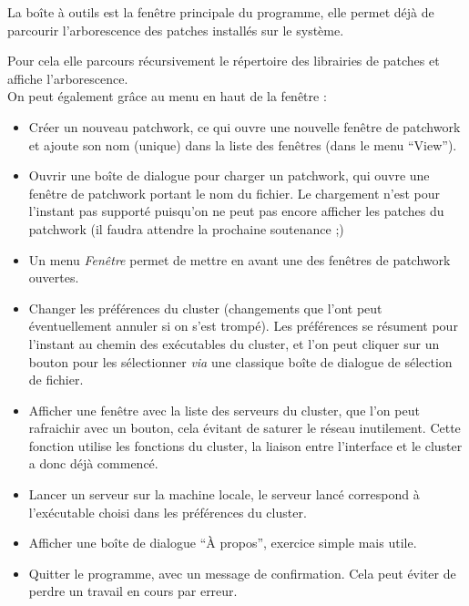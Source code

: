 \documentclass[14pt,a4paper]{report}
\begin{document}
La bo\^ite \`a outils est la fen\^etre principale du programme,
elle permet d\'ej\`a de parcourir l'arborescence des patches
install\'es sur le syst\`eme.

Pour cela elle parcours r\'ecursivement le r\'epertoire des librairies
de patches et affiche l'arborescence.\\


On peut \'egalement gr\^ace au menu en haut de la fen\^etre :
\begin{itemize}
\item
  Cr\'eer un nouveau patchwork, ce qui ouvre une nouvelle fen\^etre
  de patchwork et ajoute son nom (unique) dans la liste des fen\^etres
  (dans le menu ``View'').

\item
  Ouvrir une bo\^ite de dialogue pour charger un patchwork, qui
  ouvre une fen\^etre de patchwork portant le nom du fichier.
  Le chargement n'est pour l'instant pas support\'e puisqu'on ne peut
  pas encore afficher les patches du patchwork (il faudra attendre
  la prochaine soutenance ;)

\item
  Un menu {\it Fen\^etre} permet de mettre en avant une des
  fen\^etres de patchwork ouvertes.

\item
  Changer les pr\'ef\'erences du cluster (changements que l'ont
  peut \'eventuellement annuler si on s'est tromp\'e).
  Les pr\'ef\'erences se r\'esument pour l'instant au chemin des
  ex\'ecutables du cluster, et l'on peut cliquer sur un bouton pour
  les s\'electionner {\it via} une classique bo\^ite de dialogue de
  s\'election de fichier.

\item
  Afficher une fen\^etre avec la liste des serveurs du cluster,
  que l'on peut rafraichir avec un bouton, cela \'evitant de saturer le
  r\'eseau inutilement. Cette fonction utilise les fonctions du cluster,
  la liaison entre l'interface et le cluster a donc d\'ej\`a commenc\'e.

\item
  Lancer un serveur sur la machine locale, le serveur lanc\'e
  correspond \`a l'ex\'ecutable choisi dans les pr\'ef\'erences du
  cluster.

\item
  Afficher une bo\^ite de dialogue ``\`A propos'', exercice simple
  mais utile.

\item
  Quitter le programme, avec un message de confirmation. Cela
  peut \'eviter de perdre un travail en cours par erreur.

\end{itemize}
\rule{0cm}{0cm} \\
\end{document}
